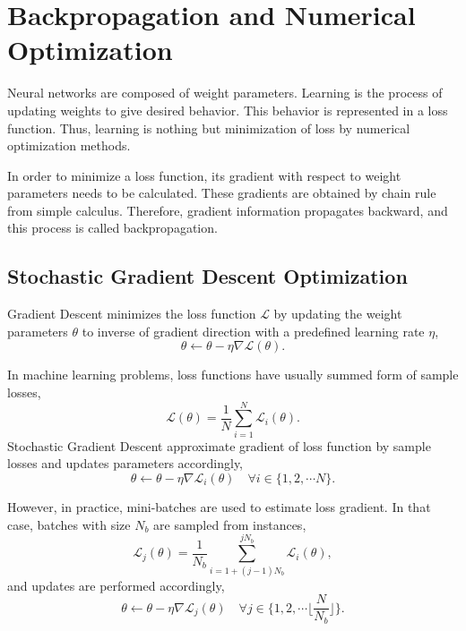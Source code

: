 \section{Backpropagation and Numerical Optimization}
\label{sec:backprop}

Neural networks are composed of weight parameters. 
Learning is the process of updating weights to give desired behavior. 
This behavior is represented in a loss function. Thus, learning is nothing but minimization of loss by numerical optimization methods. 

In order to minimize a loss function, its gradient with respect to weight parameters needs to be calculated. 
These gradients are obtained by chain rule from simple calculus. 
Therefore, gradient information propagates backward, and this process is called backpropagation. 

\subsection{Stochastic Gradient Descent Optimization}

Gradient Descent minimizes the loss function $\mathcal{L}$ by updating the weight parameters $\theta$ to inverse of gradient direction with a predefined learning rate $\eta$, 
\begin{equation}
\label{eq: grad_desc}
\theta \leftarrow \theta - \eta \nabla \mathcal{L}(\theta).
\end{equation}

In machine learning problems, loss functions have usually summed form of sample losses, 
\begin{equation}
\label{eqn:summed_loss}
\mathcal{L}(\theta) = \frac{1}{N} \sum_{i=1}^{N} \mathcal{L}_i(\theta).
\end{equation}
Stochastic Gradient Descent approximate gradient of loss function by sample losses and updates parameters accordingly,
\begin{equation}
\label{eqn:stch_grad_desc}
\theta \leftarrow \theta - \eta \nabla \mathcal{L}_i(\theta) \quad \forall i \in \{1,2, \cdots N\}.
\end{equation}

However, in practice, mini-batches are used to estimate loss gradient. 
In that case, batches with size $N_b$ are sampled from instances, \begin{equation}
\label{eqn:mb_summed_loss}
\mathcal{L}_j(\theta) = \frac{1}{N_b} \sum_{i=1 + (j-1) N_b}^{j N_b} \mathcal{L}_i(\theta),
\end{equation}
and updates are performed accordingly,
\begin{equation}
\label{eqn:mb_grad_desc}
\theta \leftarrow \theta - \eta  \nabla \mathcal{L}_j(\theta) \quad \forall j \in \{1,2, \cdots \Big\lfloor\frac{N}{N_b}\Big\rfloor\}.
\end{equation}

